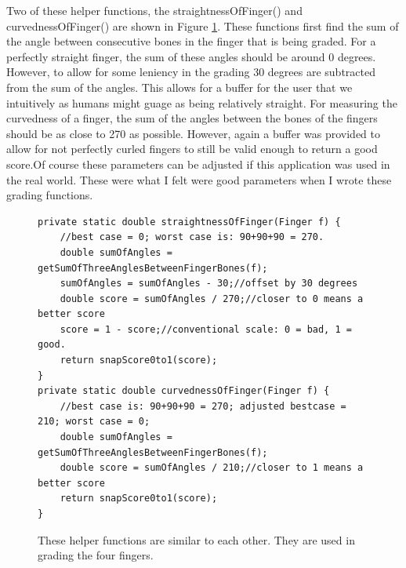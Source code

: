 Two of these helper functions, the straightnessOfFinger() and curvednessOfFinger() are shown in Figure \ref{fig:straightCurvedHelperFunctions}. These functions first find the sum of the angle between consecutive bones in the finger that is being graded. For a perfectly straight finger, the sum of these angles should be around 0 degrees. However, to allow for some leniency in the grading 30 degrees are subtracted from the sum of the angles. This allows for a buffer for the user that we intuitively as humans might guage as being relatively straight. For measuring the curvedness of a finger, the sum of the angles between the bones of the fingers should be as close to 270 as possible. However, again a buffer was provided to allow for not perfectly curled fingers to still be valid enough to return a good score.Of course these parameters can be adjusted if this application was used in the real world. These were what I felt were good parameters when I wrote these grading functions.
\begin{figure}[H]
\centering
\begin{lstlisting}
private static double straightnessOfFinger(Finger f) {
	//best case = 0; worst case is: 90+90+90 = 270.
	double sumOfAngles = getSumOfThreeAnglesBetweenFingerBones(f);
	sumOfAngles = sumOfAngles - 30;//offset by 30 degrees
	double score = sumOfAngles / 270;//closer to 0 means a better score
	score = 1 - score;//conventional scale: 0 = bad, 1 = good.
	return snapScore0to1(score);
}
private static double curvednessOfFinger(Finger f) {
	//best case is: 90+90+90 = 270; adjusted bestcase = 210; worst case = 0;
	double sumOfAngles = getSumOfThreeAnglesBetweenFingerBones(f);
	double score = sumOfAngles / 210;//closer to 1 means a better score
	return snapScore0to1(score);
}
\end{lstlisting}
\caption[straightnessOfFinger() and curvednessOfFinger()]{These helper functions are similar to each other. They are used in grading the four fingers.}
\label{fig:straightCurvedHelperFunctions}
\end{figure}		

